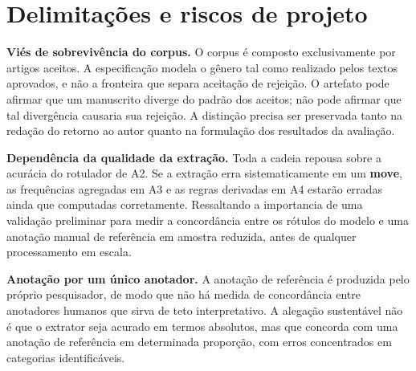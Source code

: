 


\section{Delimitações e riscos de projeto}
\label{sec:limitacoes}

\textbf{Viés de sobrevivência do corpus.} O corpus é composto exclusivamente por artigos aceitos. A especificação modela o gênero tal como realizado pelos textos aprovados, e não a fronteira que separa aceitação de rejeição. O artefato pode afirmar que um manuscrito diverge do padrão dos aceitos; não pode afirmar que tal divergência causaria sua rejeição. A distinção precisa ser preservada tanto na redação do retorno ao autor quanto na formulação dos resultados da avaliação.

\textbf{Dependência da qualidade da extração.} Toda a cadeia repousa sobre a acurácia do rotulador de A2. Se a extração erra sistematicamente em um \textbf{move}, as frequências agregadas em A3 e as regras derivadas em A4 estarão erradas ainda que computadas corretamente. Ressaltando a importancia de uma validação preliminar para medir a concordância entre os rótulos do modelo e uma anotação manual de referência em amostra reduzida, antes de qualquer processamento em escala.

\textbf{Anotação por um único anotador.} A anotação de referência é produzida pelo próprio pesquisador, de modo que não há medida de concordância entre anotadores humanos que sirva de teto interpretativo. A alegação sustentável não é que o extrator seja acurado em termos absolutos, mas que concorda com uma anotação de referência em determinada proporção, com erros concentrados em categorias identificáveis.

